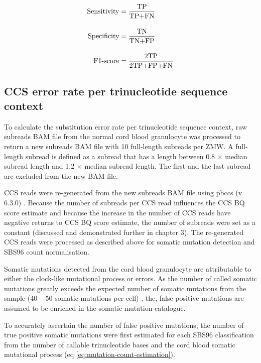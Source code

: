 \begin{equation}
\begin{aligned} 
\text{Sensitivity} &= \frac{\text{TP}}{\text{TP+FN}} \\[1em] 
\bigskip \text{Specificity} &= \frac{\text{TN}}{\text{TN+FP}} \\[1em] 
\text{F1-score} &= \frac{\text{2TP}}{\text{2TP+FP+FN}}
\end{aligned}
\label{eq:sensitivity-specificity}
\end{equation}

\subsection{CCS error rate per trinucleotide sequence context}

To calculate the substitution error rate per trinucleotide sequence context, raw subreads BAM file from the normal cord blood granulocyte was processed to return a new subreads BAM file with 10 full-length subreads per ZMW. A full-length subread is defined as a subread that has a length between 0.8 $\times$ median subread length and 1.2 $\times$ median subread length. The first and the last subread are excluded from the new BAM file. 

CCS reads were re-generated from the new subreads BAM file using pbccs (v 6.3.0) \cite{}. Because the number of subreads per CCS read influences the CCS BQ score estimate and because the increase in the number of CCS reads have negative returns to CCS BQ score estimate, the number of subreads were set as a constant (discussed and demonstrated further in chapter 3). The re-generated CCS reads were processed as described above for somatic mutation detection and SBS96 count normalisation. 

Somatic mutations detected from the cord blood granulocyte are attributable to either the clock-like mutational process or errors. As the number of called somatic mutations greatly exceeds the expected number of somatic mutations from the sample (40 – 50 somatic mutations per cell) \cite{Osorio2018-mh, Mitchell2022-ry}, the, false positive mutations are assumed to be enriched in the somatic mutation catalogue. 
 
To accurately ascertain the number of false positive mutations, the number of true positive somatic mutations were first estimated for each SBS96 classification from the number of callable trinucleotide bases and the cord blood somatic mutational process (eq \ref{eq:mutation-count-estimation}). 

